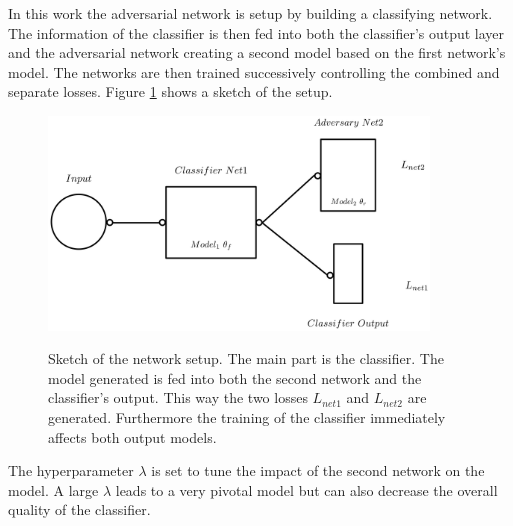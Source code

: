 In this work the adversarial network is setup by building a classifying network. The information of the classifier is then fed into both the classifier's output layer and the adversarial network creating a second model based on the first network's model. The networks are then trained successively controlling the combined and separate losses. Figure \ref{fig:ANN_sketch} shows a sketch of the setup.

\begin{figure}
	\centering
	\includegraphics[width=0.9\textwidth]{figures_ML/ANN_sketch.png}
	\label{fig:ANN_sketch}
	\caption{Sketch of the network setup. The main part is the classifier. The model generated is fed into both the second network and the classifier's output. This way the two losses $L_{net1}$ and $L_{net2}$ are generated. Furthermore the training of the classifier immediately affects both output models.}
\end{figure}

The hyperparameter $\lambda$ is set to tune the impact of the second network on the model. A large $\lambda$ leads to a very pivotal model but can also decrease the overall quality of the classifier. 


